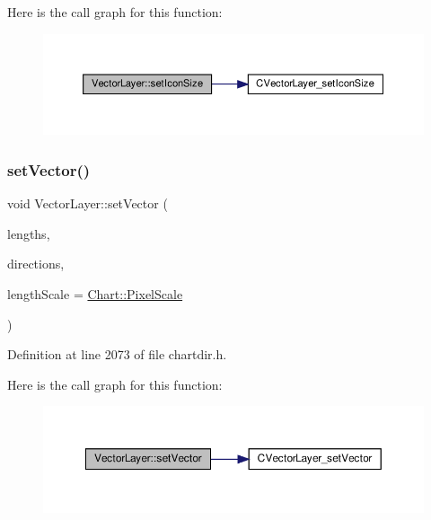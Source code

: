 Here is the call graph for this function\+:
\nopagebreak
\begin{figure}[H]
\begin{center}
\leavevmode
\includegraphics[width=350pt]{class_vector_layer_a8f1d79e2e95a55949b4b4b5941f44079_cgraph}
\end{center}
\end{figure}
\mbox{\label{class_vector_layer_a59c6b8884d7aafc20e92089b3e4dd6d3}} 
\subsubsection{\texorpdfstring{set\+Vector()}{setVector()}}
{\footnotesize\ttfamily void Vector\+Layer\+::set\+Vector (\begin{DoxyParamCaption}\item[{\hyperlink{class_double_array}{Double\+Array}}]{lengths,  }\item[{\hyperlink{class_double_array}{Double\+Array}}]{directions,  }\item[{int}]{length\+Scale = {\ttfamily \hyperlink{namespace_chart_af8005281e1fb57d737e9f89b13605808afebebf69a28e58958dc5f9da3ece2147}{Chart\+::\+Pixel\+Scale}} }\end{DoxyParamCaption})\hspace{0.3cm}{\ttfamily [inline]}}



Definition at line 2073 of file chartdir.\+h.

Here is the call graph for this function\+:
\nopagebreak
\begin{figure}[H]
\begin{center}
\leavevmode
\includegraphics[width=350pt]{class_vector_layer_a59c6b8884d7aafc20e92089b3e4dd6d3_cgraph}
\end{center}
\end{figure}
\mbox{\label{class_vector_layer_a150bc907bcb2eb5d398a908a1bd09082}} 
